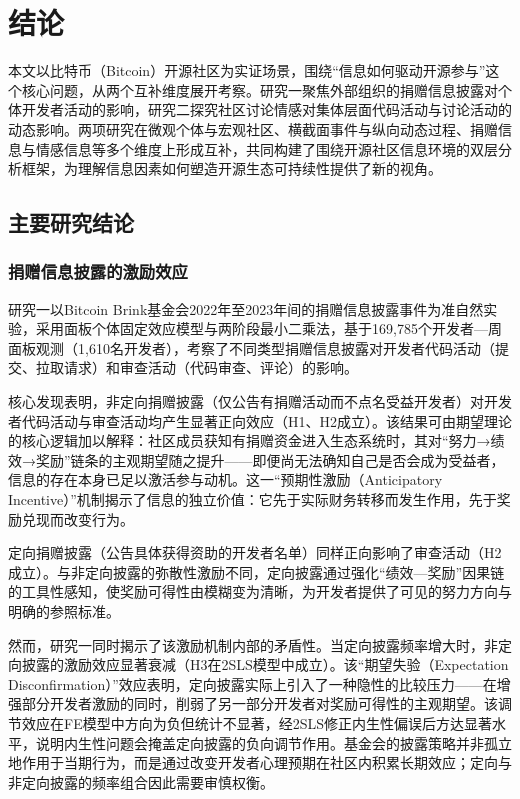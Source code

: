\chapter{结论}

本文以比特币（Bitcoin）开源社区为实证场景，围绕“信息如何驱动开源参与”这个核心问题，从两个互补维度展开考察。研究一聚焦外部组织的捐赠信息披露对个体开发者活动的影响，研究二探究社区讨论情感对集体层面代码活动与讨论活动的动态影响。两项研究在微观个体与宏观社区、横截面事件与纵向动态过程、捐赠信息与情感信息等多个维度上形成互补，共同构建了围绕开源社区信息环境的双层分析框架，为理解信息因素如何塑造开源生态可持续性提供了新的视角。

\section{主要研究结论}

\subsection{捐赠信息披露的激励效应}

研究一以Bitcoin Brink基金会2022年至2023年间的捐赠信息披露事件为准自然实验，采用面板个体固定效应模型与两阶段最小二乘法，基于169,785个开发者—周面板观测（1,610名开发者），考察了不同类型捐赠信息披露对开发者代码活动（提交、拉取请求）和审查活动（代码审查、评论）的影响。

核心发现表明，非定向捐赠披露（仅公告有捐赠活动而不点名受益开发者）对开发者代码活动与审查活动均产生显著正向效应（H1、H2成立）。该结果可由期望理论的核心逻辑加以解释：社区成员获知有捐赠资金进入生态系统时，其对“努力→绩效→奖励”链条的主观期望随之提升——即便尚无法确知自己是否会成为受益者，信息的存在本身已足以激活参与动机。这一“预期性激励（Anticipatory Incentive）”机制揭示了信息的独立价值：它先于实际财务转移而发生作用，先于奖励兑现而改变行为。

定向捐赠披露（公告具体获得资助的开发者名单）同样正向影响了审查活动（H2成立）。与非定向披露的弥散性激励不同，定向披露通过强化“绩效—奖励”因果链的工具性感知，使奖励可得性由模糊变为清晰，为开发者提供了可见的努力方向与明确的参照标准。

然而，研究一同时揭示了该激励机制内部的矛盾性。当定向披露频率增大时，非定向披露的激励效应显著衰减（H3在2SLS模型中成立）。该“期望失验（Expectation Disconfirmation）”效应表明，定向披露实际上引入了一种隐性的比较压力——在增强部分开发者激励的同时，削弱了另一部分开发者对奖励可得性的主观期望。该调节效应在FE模型中方向为负但统计不显著，经2SLS修正内生性偏误后方达显著水平，说明内生性问题会掩盖定向披露的负向调节作用。基金会的披露策略并非孤立地作用于当期行为，而是通过改变开发者心理预期在社区内积累长期效应；定向与非定向披露的频率组合因此需要审慎权衡。

